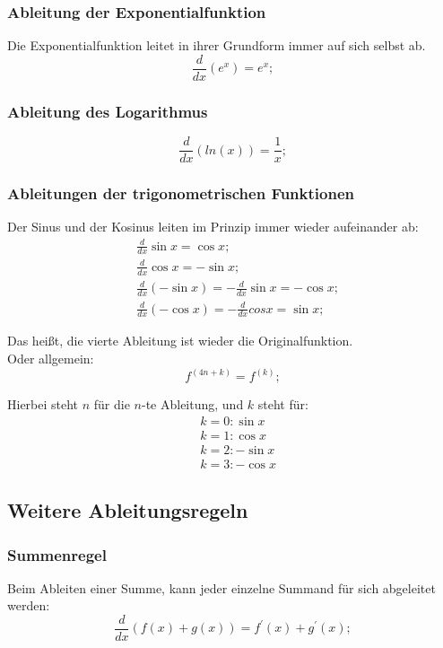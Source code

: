 \documentclass[a4paper]{article}
\begin{document}
\subsubsection{Ableitung der Exponentialfunktion}
Die Exponentialfunktion leitet in ihrer Grundform immer auf sich selbst ab.
\[
	\frac{d}{dx} \left( e^x \right) = e^x ;
\]

\subsubsection{Ableitung des Logarithmus}
\[
	\frac{d}{dx} \left( ln(x) \right) = \frac{1}{x} ;
\]

\subsubsection{Ableitungen der trigonometrischen Funktionen}
Der Sinus und der Kosinus leiten im Prinzip immer wieder aufeinander ab:
\begin{align*}
	& \frac{d}{dx} \sin{x} = \cos{x} ;
	\\
	& \frac{d}{dx} \cos{x} = -\sin{x} ;
	\\
	& \frac{d}{dx} \left( -\sin{x} \right) = -\frac{d}{dx} \sin{x} = -\cos{x} ;
	\\
	& \frac{d}{dx} \left( -\cos{x} \right) = -\frac{d}{dx} cos{x} = \sin{x} ;
\end{align*}

Das hei{\ss}t,
die vierte Ableitung ist wieder die Originalfunktion.\\
Oder allgemein:
\[
	f^{(4n + k)} = f^{(k)} ;
\]

Hierbei steht $n$ f\"ur die $n$-te Ableitung, und $k$ steht f\"ur:
\begin{align*}
	& k = 0: \sin{x}
	\\
	& k = 1: \cos{x}
	\\
	& k = 2: -\sin{x}
	\\
	& k = 3: -\cos{x}
\end{align*}

\subsection{Weitere Ableitungsregeln}

\subsubsection{Summenregel}
Beim Ableiten einer Summe, kann jeder einzelne Summand f\"ur sich abgeleitet werden:
\[
	\frac{d}{dx} \left( f(x) + g(x) \right) = f^\prime(x) + g^\prime(x) ;
\]
\end{document}
